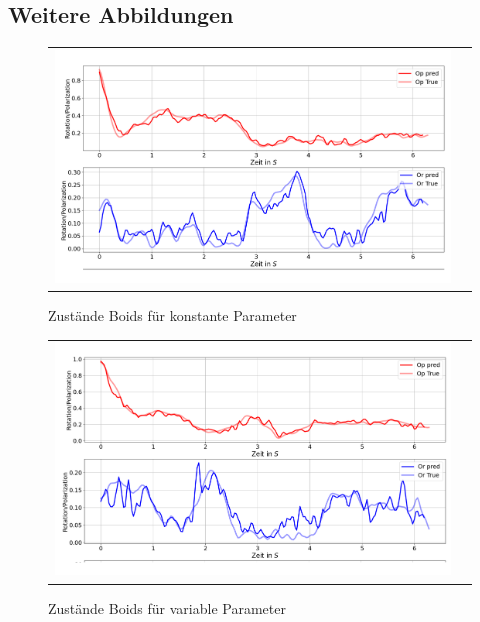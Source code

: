 \renewcommand\appendixtocname{Anhänge}
\renewcommand\appendixpagename{Anhänge}
\begin{appendices}

\chapter{Weitere Abbildungen}

\begin{figure}[H]
\centering
\begin{tabular}{cc}
\includegraphics[width=1.0\textwidth]{figures/Anhang/Boids_random_False.png} 
\end{tabular}
\caption{Zustände Boids für konstante Parameter }
\end{figure}

\begin{figure}[H]
\centering
\begin{tabular}{cc}
\includegraphics[width=1.0\textwidth]{figures/Anhang/Boids_random_True.png} 
\end{tabular}
\caption{Zustände Boids für variable Parameter }
\end{figure}


\end{appendices}
